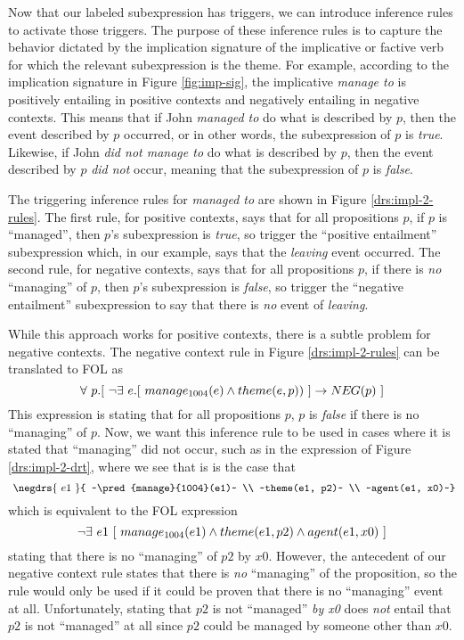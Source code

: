Now that our labeled subexpression has triggers, we can introduce inference
rules to activate those triggers.  The purpose of these inference rules is to
capture the behavior dictated by the implication signature of the implicative or factive
verb for which the relevant subexpression is the theme.  For example, according
to the implication signature in Figure \ref{fig:imp-sig}, the implicative {\it
manage to} is positively entailing in positive contexts and negatively entailing in negative contexts.
This means that if John {\it managed to} do what is described by $p$, then the
event described by $p$ occurred, or in other words, the subexpression of $p$ is
{\it true}. Likewise, if John {\it did not manage to} do what is described by
$p$, then the event described by $p$ {\it did not} occur, meaning that the
subexpression of $p$ is {\it false}.  

The triggering inference rules for {\it managed to} are shown in Figure
\ref{drs:impl-2-rules}.  The first rule, for positive contexts, says that for
all propositions $p$, if $p$ is ``managed'', then $p$'s subexpression is {\it
true}, so trigger the ``positive entailment'' subexpression which, in our
example, says that the {\it leaving} event occurred.  The second rule, for
negative contexts, says that for all propositions $p$, if there is {\it no}
``managing'' of $p$, then $p$'s subexpression is {\it false}, so trigger the
``negative entailment'' subexpression to say that there is {\it no} event of
{\it leaving}.

While this approach works for positive contexts, there is a subtle problem for
negative contexts.  The negative context rule in Figure \ref{drs:impl-2-rules}
can be translated to FOL as \[ \forall~ p.[~ \lnot \exists~ e.[~ \pred{manage}{1004}(e) 
\land theme(e,p)) ~] \to \NEGPRED{p} ~] \] This expression is stating that for all
propositions $p$, $p$ is {\it false} if there is no ``managing'' of $p$.  Now,
we want this inference rule to be used in cases where it is stated that
``managing'' did not occur, such as in the expression of Figure
\ref{drs:impl-2-drt}, where we see that is is the case that \[ ~\negdrs{~e1~}{ 
~\pred{manage}{1004}(e1)~ \\ ~theme(e1, p2)~ \\ ~agent(e1, x0)~} \] which is
equivalent to the FOL expression \[ \lnot \exists~ e1 ~[~ 
manage_{1004}(e1) \land theme(e1, p2) \land agent(e1, x0) ~] \] 
stating that there is no ``managing''
of $p2$ by $x0$.  However, the antecedent of our negative context rule states
that there is {\it no} ``managing'' of the proposition, so the rule would only
be used if it could be proven that there is no ``managing'' event at all.
Unfortunately, stating that $p2$ is not ``managed'' {\it by x0} does {\it not}
entail that $p2$ is not ``managed'' at all since $p2$ could be managed by
someone other than $x0$.

